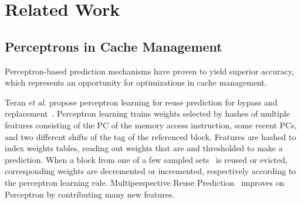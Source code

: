 \section{Related Work}
\label{related}

\subsection{Perceptrons in Cache Management}

Perceptron-based prediction mechanisms have proven to yield superior accuracy, 
which represents an opportunity for optimizations in cache management. 

Teran \textit{et al.} propose perceptron learning for reuse prediction for
bypass and replacement~\cite{Perc_Reuse}. Perceptron learning trains weights
selected by hashes of multiple features consisting of the PC of the memory
access instruction, some recent PCs, and two different shifts of the tag of
the referenced block. Features are hashed to index weights tables, reading out
weights that are and thresholded to make a prediction. When a block from one
of a few sampled sets~\cite{sdbp} is reused or evicted, corresponding weights
are decremented or incremented, respectively according to the perceptron
learning rule.  Multiperspective Reuse Prediction~\cite{Multiperspective}
improves on Perceptron by contributing many new features.


